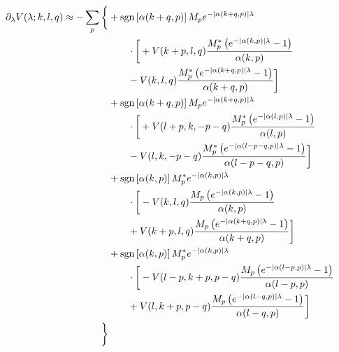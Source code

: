 \begin{align*}
	\partial_{\lambda} V(\lambda; k, l, q) \approx - \sum_{p} \bigg\{ &+\operatorname{sgn} \left[\alpha (k+q, p)\right] M_{p} e^{ - | \alpha (k+q,p) | \lambda }\\
		&\qquad\cdot\bigg[  + V(k+p, l, q) \frac{M_{p}^* \left(  e^{ - | \alpha (k,p) | \lambda } - 1 \right)}{\alpha (k, p)}\\
		&\qquad - V(k, l, q) \frac{M_{p}^* \left(  e^{ - | \alpha (k+q,p) | \lambda } - 1 \right)}{\alpha (k+q, p)} \bigg]\\
	&+\operatorname{sgn} \left[\alpha (k+q, p)\right] M_{p} e^{ - | \alpha (k+q,p) | \lambda }\\
		&\qquad\cdot\bigg[  + V(l+p, k, -p-q) \frac{M_{p}^* \left(  e^{ - | \alpha (l,p) | \lambda } - 1 \right)}{\alpha (l, p)}\\
		&\qquad - V(l, k, -p-q) \frac{M_{p}^* \left(  e^{ - | \alpha (l-p-q,p) | \lambda } - 1 \right)}{\alpha (l-p-q, p)} \bigg]\\
	&+\operatorname{sgn} \left[\alpha (k, p)\right] M_{p}^* e^{ - | \alpha (k,p) | \lambda }\\
		&\qquad\cdot\bigg[  - V(k, l, q) \frac{M_{p} \left(  e^{ - | \alpha (k,p) | \lambda } - 1 \right) }{\alpha (k, p)}\\
		&\qquad + V(k+p, l, q) \frac{M_{p} \left(  e^{ - | \alpha (k+q,p) | \lambda } - 1 \right)}{\alpha (k+q, p)} \bigg]\\
	&+\operatorname{sgn} \left[\alpha (k, p)\right] M_{p}^* e^{ - | \alpha (k,p) | \lambda }\\
		&\qquad\cdot\bigg[  - V(l-p, k+p, p-q) \frac{M_{p} \left(  e^{ - | \alpha (l-p,p) | \lambda } - 1 \right) }{\alpha (l-p, p)}\\
		&\qquad + V(l, k+p, p-q) \frac{M_{p} \left(  e^{ - | \alpha (l-q,p) | \lambda } - 1 \right)}{\alpha (l-q, p)} \bigg]\\
	 \bigg\}
\end{align*}
